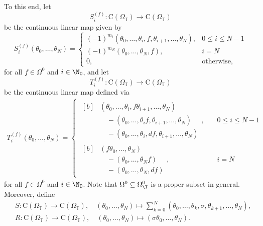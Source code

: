 \documentclass[a4paper, english, 12pt, bibliography=totocnumbered,
index=totoc]{scrartcl}
\begin{document}
To this end, let
\begin{equation*}
	S_i^{(f)} \colon \mathrm{C}(\Omega_{\mathbb{T}}) \to
	\mathrm{C}(\Omega_{\mathbb{T}})
\end{equation*}
be the continuous linear map given by
\begin{equation}\label{Si f}
	S_i^{(f)}(\theta_0, \dots, \theta_N) =
	\begin{cases}
		(-1)^{m_i}(\theta_0, \ldots, \theta_{i}, f, \theta_{i+1}, \ldots,
		\theta_N), & 0 \leq i \leq N - 1 \\
		(-1)^{m_N}(\theta_0, \ldots, \theta_N, f), & i = N \\
		0, & \text{otherwise},
	\end{cases}
\end{equation}
for all $f \in \Omega^0$ and $i\in \N_0$, and let
\begin{equation*}
	T_i^{(f)} \colon \mathrm{C}(\Omega_{\mathbb{T}}) \to
	\mathrm{C}(\Omega_{\mathbb{T}})
\end{equation*}
be the continuous linear map defined via
\begin{align*}
	T_i^{(f)}(\theta_0, \ldots, \theta_N) =
	\begin{cases}
		\begin{aligned}[b]
			& (\theta_0, \ldots, \theta_i, f \theta_{i+1}, \ldots, \theta_N)
			\\
			& \quad -(\theta_0, \ldots, \theta_i f, \theta_{i+1}, \ldots,
			\theta_N)
			\\
			& \quad -(\theta_0, \ldots, \theta_i, df, \theta_{i+1}, \ldots,
			\theta_N)
		\end{aligned}, & \quad 0 \leq i \leq N - 1 \\
		\begin{aligned}[b]
			& (f\theta_0, \ldots, \theta_N) \\
			& \quad -(\theta_0, \ldots, \theta_N f) \\
			& \quad -(\theta_0, \ldots, \theta_N, df)
		\end{aligned}, & \quad i = N
	\end{cases}
\end{align*}
for all $f \in \Omega^0$ and $i\in \N_0$.
Note that $\Omega^0 \subseteq \Omega_\T^0$ is a proper subset in general.
Moreover, define
\begin{align}
	&S \colon \mathrm{C}(\Omega_{\mathbb{T}}) \to
	\mathrm{C}(\Omega_{\mathbb{T}}), \quad (\theta_0, \dots, \theta_N) \mapsto
	\sum_{k=0}^N (\theta_0, \dots, \theta_{k}, \sigma, \theta_{k+1}, \dots,
	\theta_N),\label{Chen normalization S}\\
	&R \colon \mathrm{C}(\Omega_{\mathbb{T}}) \to
	\mathrm{C}(\Omega_{\mathbb{T}}), \quad (\theta_0, \dots, \theta_N) \mapsto
	(\sigma \theta_0, \dots, \theta_N).\label{Chen normalization R}
\end{align}
\end{document}
